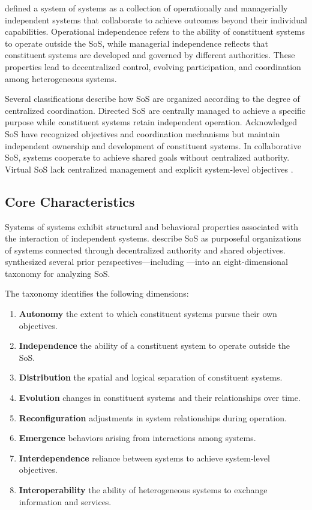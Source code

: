\citet{maier1998architecting} defined a system of systems as a collection of operationally and managerially independent systems that collaborate to achieve outcomes beyond their individual capabilities. Operational independence refers to the ability of constituent systems to operate outside the SoS, while managerial independence reflects that constituent systems are developed and governed by different authorities. These properties lead to decentralized control, evolving participation, and coordination among heterogeneous systems.

Several classifications describe how SoS are organized according to the degree of centralized coordination. Directed SoS are centrally managed to achieve a specific purpose while constituent systems retain independent operation. Acknowledged SoS have recognized objectives and coordination mechanisms but maintain independent ownership and development of constituent systems. In collaborative SoS, systems cooperate to achieve shared goals without centralized authority. Virtual SoS lack centralized management and explicit system-level objectives \cite{nielsen2015systems,dahmann2008systems}.

\subsection{Core Characteristics}

Systems of systems exhibit structural and behavioral properties associated with the interaction of independent systems. \citet{boardman2006system} describe SoS as purposeful organizations of systems connected through decentralized authority and shared objectives. \citet{nielsen2015systems} synthesized several prior perspectives---including \cite{boulding1956general,ackoff1971towards,pei2000system,boardman2006system,keating2003system,kotov1999systems,maier1998architecting,shenhar19952}---into an eight-dimensional taxonomy for analyzing SoS.

The taxonomy identifies the following dimensions:
\begin{enumerate}[noitemsep]
\item \textbf{Autonomy} the extent to which constituent systems pursue their own objectives.
\item \textbf{Independence} the ability of a constituent system to operate outside the SoS.
\item \textbf{Distribution} the spatial and logical separation of constituent systems.
\item \textbf{Evolution} changes in constituent systems and their relationships over time.
\item \textbf{Reconfiguration} adjustments in system relationships during operation.
\item \textbf{Emergence} behaviors arising from interactions among systems.
\item \textbf{Interdependence} reliance between systems to achieve system-level objectives.
\item \textbf{Interoperability} the ability of heterogeneous systems to exchange information and services.
\end{enumerate}

